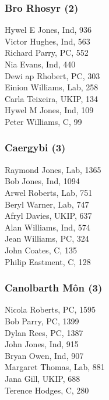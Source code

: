 \documentclass[a4paper,openany,10pt]{book}
\begin{document}
\subsubsection*{Bro Rhosyr (2)}



Hywel E Jones, Ind, 936\\
Victor Hughes, Ind, 563\\
Richard Parry, PC, 552\\
Nia Evans, Ind, 440\\
Dewi ap Rhobert, PC, 303\\
Einion Williams, Lab, 258\\
Carla Teixeira, UKIP, 134\\
Hywel M Jones, Ind, 109\\
Peter Williams, C, 99\\


\subsubsection*{Caergybi (3)}



Raymond Jones, Lab, 1365\\
Bob Jones, Ind, 1094\\
Arwel Roberts, Lab, 751\\
Beryl Warner, Lab, 747\\
Afryl Davies, UKIP, 637\\
Alan Williams, Ind, 574\\
Jean Williams, PC, 324\\
John Coates, C, 135\\
Philip Eastment, C, 128\\


\subsubsection*{Canolbarth Môn (3)}



Nicola Roberts, PC, 1595\\
Bob Parry, PC, 1399\\
Dylan Rees, PC, 1387\\
John Jones, Ind, 915\\
Bryan Owen, Ind, 907\\
Margaret Thomas, Lab, 881\\
Jana Gill, UKIP, 688\\
Terence Hodges, C, 280\\
\end{document}
